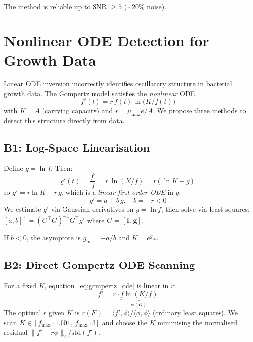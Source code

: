 \documentclass[11pt,a4paper]{article}
\begin{document}
The method is reliable up to SNR $\geq 5$ ($\sim$20\% noise).

\section{Nonlinear ODE Detection for Growth Data}
\label{sec:nonlinear_ode}

Linear ODE inversion incorrectly identifies oscillatory structure in bacterial growth data.
The Gompertz model satisfies the \emph{nonlinear} ODE
\begin{equation}
  f'(t) = r\,f(t)\,\ln\!\bigl(K / f(t)\bigr)
  \label{eq:gompertz_ode}
\end{equation}
with $K = A$ (carrying capacity) and $r = \mu_{\max} e / A$.
We propose three methods to detect this structure directly from data.

\subsection{B1: Log-Space Linearisation}

Define $g = \ln f$. Then:
\begin{equation}
  g'(t) = \frac{f'}{f} = r\,\ln(K/f) = r(\ln K - g)
\end{equation}
so $g' = r\ln K - r\,g$, which is a \emph{linear first-order ODE} in $g$:
\begin{equation}
  g' = a + b\,g, \quad b = -r < 0
\end{equation}
We estimate $g'$ via Gaussian derivatives on $g = \ln f$, then solve via least squares:
$[a, b]^\top = (G^\top G)^{-1} G^\top g'$ where $G = [\mathbf{1}, \mathbf{g}]$.

If $b < 0$, the asymptote is $g_\infty = -a/b$ and $K = e^{g_\infty}$.

\subsection{B2: Direct Gompertz ODE Scanning}

For a fixed $K$, equation~\eqref{eq:gompertz_ode} is linear in $r$:
\begin{equation}
  f' = r \cdot \underbrace{f \ln(K/f)}_{\phi(K)}
\end{equation}
The optimal $r$ given $K$ is $r(K) = \langle f', \phi \rangle / \langle \phi, \phi \rangle$
(ordinary least squares). We scan $K \in [f_{\max} \cdot 1.001,\, f_{\max} \cdot 3]$ and
choose the $K$ minimising the normalised residual
$\|f' - r\phi\|_2 / \mathrm{std}(f')$.
\end{document}
